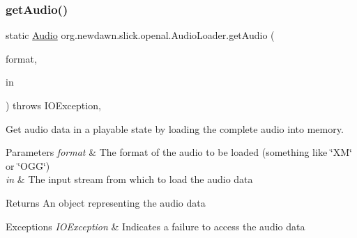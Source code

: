 \subsubsection{\texorpdfstring{get\+Audio()}{getAudio()}}
{\footnotesize\ttfamily static \mbox{\hyperlink{interfaceorg_1_1newdawn_1_1slick_1_1openal_1_1_audio}{Audio}} org.\+newdawn.\+slick.\+openal.\+Audio\+Loader.\+get\+Audio (\begin{DoxyParamCaption}\item[{String}]{format,  }\item[{Input\+Stream}]{in }\end{DoxyParamCaption}) throws I\+O\+Exception\hspace{0.3cm}{\ttfamily [inline]}, {\ttfamily [static]}}

Get audio data in a playable state by loading the complete audio into memory.


\begin{DoxyParams}{Parameters}
{\em format} & The format of the audio to be loaded (something like \char`\"{}\+X\+M\char`\"{} or \char`\"{}\+O\+G\+G\char`\"{}) \\
\hline
{\em in} & The input stream from which to load the audio data \\
\hline
\end{DoxyParams}
\begin{DoxyReturn}{Returns}
An object representing the audio data 
\end{DoxyReturn}

\begin{DoxyExceptions}{Exceptions}
{\em I\+O\+Exception} & Indicates a failure to access the audio data \\
\hline
\end{DoxyExceptions}

